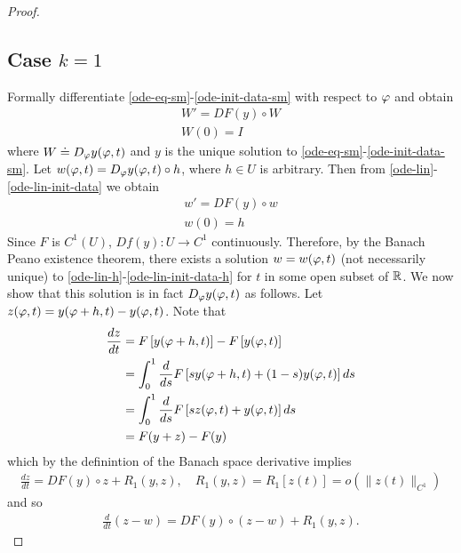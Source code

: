 \begin{proof}
 \subsection{Case $k=1$} 
  \label{ssec:case-k}
Formally differentiate
\eqref{ode-eq-sm}-\eqref{ode-init-data-sm} with respect to $\varphi$ and obtain
%
%
%
\begin{gather}
  W' = DF(y) \circ W
  \label{ode-lin}
  \\
  W(0) = I
  \label{ode-lin-init-data}
\end{gather}
%
%
where $W \doteq D_{\varphi} y(\varphi,t)$ and $y$ is the unique solution to
\eqref{ode-eq-sm}-\eqref{ode-init-data-sm}. Let $w(\varphi,t) = D_{\varphi}y(\varphi,t) \circ h$, where $h \in U$ is
arbitrary. Then
from \eqref{ode-lin}-\eqref{ode-lin-init-data} we
obtain
%
%
\begin{gather}
  w' = DF(y) \circ w 
  \label{ode-lin-h}
  \\
  w(0) = h
  \label{ode-lin-init-data-h}
\end{gather}
%
%
Since $F$ is $C^{1}(U)$, $Df(y): U \to C^{1}$ continuously. Therefore, by the Banach Peano
existence theorem, there exists a solution $w = w(\varphi,t)$ (not necessarily unique) to
\eqref{ode-lin-h}-\eqref{ode-lin-init-data-h} for $t$ in some open subset of
$\mathbb{R}$. We now show that this solution is in fact $D_{\varphi} y(\varphi,t)$ as follows. Let
$z(\varphi,t) = y(\varphi + h, t) - y(\varphi,t)$. Note that
%
%
\begin{equation}
  \label{uhh}
\begin{split}
\frac{dz}{dt} 
& = F\left[ y(\varphi + h, t) \right] - F\left[ y(\varphi,t) \right]
\\
& = \int_{0}^{1} \frac{d}{ds} F\left[ sy(\varphi+h, t) + (1-s)y(\varphi,t) \right]ds
\\
& = \int_{0}^{1} \frac{d}{ds} F\left[ sz(\varphi,t) + y(\varphi,t) \right] ds
\\
& = F(y+z) - F(y)
\end{split}
\end{equation}
%
%
which by the definintion of the Banach space derivative implies
%
%
\begin{equation*}
\begin{split}
  \frac{dz}{dt} = DF(y) \circ z + R_{1}(y,z), \quad R_{1}(y,z) = R_{1}[z(t)] = o(\|
  z(t) \|_{C^{1}})
\end{split}
\end{equation*}
%
%
and so
%
%
\begin{equation*}
\begin{split}
  \frac{d}{dt}(z-w) = DF(y) \circ (z-w) + R_{1}(y,z).

\end{split}
\end{equation*}
\end{proof}
